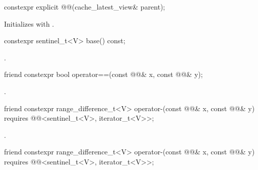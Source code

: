 %
\begin{itemdecl}
constexpr explicit @@(cache_latest_view& parent);
\end{itemdecl}

\begin{itemdescr}
\pnum
\effects
Initializes  with .
\end{itemdescr}

%
\begin{itemdecl}
constexpr sentinel_t<V> base() const;
\end{itemdecl}

\begin{itemdescr}
\pnum
\returns
{}.
\end{itemdescr}

%
%
\begin{itemdecl}
friend constexpr bool operator==(const @@& x, const @@& y);
\end{itemdecl}

\begin{itemdescr}
\pnum
\returns
{}.
\end{itemdescr}

%
%
\begin{itemdecl}
friend constexpr range_difference_t<V> operator-(const @@& x, const @@& y)
  requires @@<sentinel_t<V>, iterator_t<V>>;
\end{itemdecl}

\begin{itemdescr}
\pnum
\returns
{}.
\end{itemdescr}

%
%
\begin{itemdecl}
friend constexpr range_difference_t<V> operator-(const @@& x, const @@& y)
  requires @@<sentinel_t<V>, iterator_t<V>>;
\end{itemdecl}

